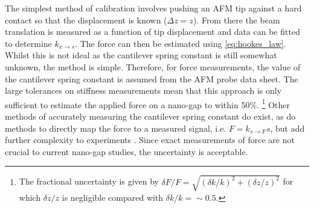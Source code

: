 \documentclass{article}
\begin{document}
The simplest method of calibration involves pushing an AFM tip against a hard contact so that the displacement is known ($\Delta z = z$). From there the beam translation is measured as a function of tip displacement and data can be fitted to determine $k_{x \rightarrow s}$. The force can then be estimated using \eqref{eq:hookes_law}. Whilst this is not ideal as the cantilever spring constant is still somewhat unknown, the method is simple. Therefore, for force measurements, the value of the cantilever spring constant is assumed from the AFM probe data sheet. The large tolerances on stiffness measurements mean that this approach is only sufficient to estimate the applied force on a nano-gap to within 50\%.%
\footnote{The fractional uncertainty is given by  $\delta F/F = \sqrt{(\delta k/k)^2+(\delta z/z)^2}$ for which $\delta z/z$ is negligible compared with $\delta k/k=\sim0.5$.}
Other methods of accurately measuring the cantilever spring constant do exist, as do methods to directly map the force to a measured signal, i.e. $F = k_{s \rightarrow F}s$, but add further complexity to experiments \cite{hutter1993calibration, senden1994experimental, torii1996method, sader1999calibration, levy2002measuring, cumpson2004quantitative, gates2007precise, langlois2007spring, ohler2007cantilever}. Since exact measurements of force are not crucial to current nano-gap studies, the uncertainty is acceptable.

\FloatBarrier
\end{document}
